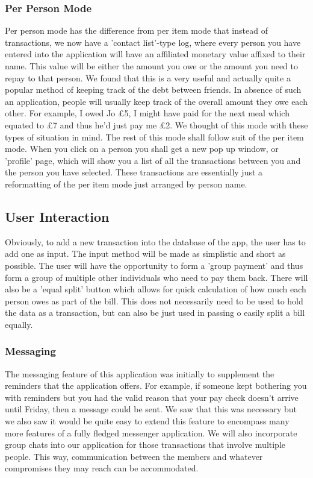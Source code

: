 \documentclass[a4paper,9t]{article}
\begin{document}
\subsubsection*{Per Person Mode}
Per person mode has the difference from per item mode that instead of transactions, we now have a 'contact list'-type log, where every person you have entered into the application will have an affiliated monetary value affixed to their name. This value will be either the amount you owe or the amount you need to repay to that person. 
We found that this is a very useful and actually quite a popular method of keeping track of the debt between friends. In absence of such an application, people will usually keep track of the overall amount they owe each other. For example, I owed Jo £5, I might have paid for the next meal which equated to £7 and thus he'd just pay me £2. We thought of this mode with these types of situation in mind.
The rest of this mode shall follow suit of the per item mode. When you click on a person you shall get a new pop up window, or 'profile' page, which will show you a list of all the transactions between you and the person you have selected. These transactions are essentially just a reformatting of the per item mode just arranged by person name.

\subsection*{User Interaction}
Obviously, to add a new transaction into the database of the app, the user has to add one as input. The input method will be made as simplistic and short as possible. The user will have the opportunity to form a 'group payment' and thus form a group of multiple other individuals who need to pay them back. There will also be a 'equal split' button which allows for quick calculation of how much each person owes as part of the bill. This does not necessarily need to be used to hold the data as a transaction, but can also be just used in passing o easily split a bill equally.

\subsubsection*{Messaging}
The messaging feature of this application was initially to supplement the reminders that the application offers. For example, if someone kept bothering you with reminders but you had the valid reason that your pay check doesn't arrive until Friday, then a message could be sent.
We saw that this was necessary but we also saw it would be quite easy to extend this feature to encompass many more features of a fully fledged messenger application.
We will also incorporate group chats into our application for those transactions that involve multiple people. This way, communication between the members and whatever compromises they may reach can be accommodated.
\end{document}
